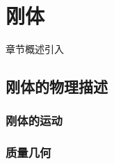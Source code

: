 \chapter{刚体}\label{7}

章节概述引入

\section{刚体的物理描述}\label{7-1}

\subsection{刚体的运动}\label{7-1-1}

\subsection{质量几何}\label{7-1-2}